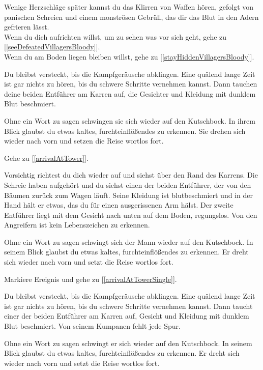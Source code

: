 Wenige Herzschläge später kannst du das Klirren von Waffen hören, gefolgt von panischen Schreien und einem monströsen Gebrüll, das dir das Blut in den Adern gefrieren lässt.
\\Wenn du dich aufrichten willst, um zu sehen was vor sich geht, gehe zu [\ref{seeDefeatedVillagersBloody}].
\\Wenn du am Boden liegen bleiben willst, gehe zu [\ref{stayHiddenVillagersBloody}].


Du bleibst versteckt, bis die Kampfgeräusche abklingen. Eine quälend lange Zeit ist gar nichts zu hören, bis du schwere Schritte vernehmen kannst. Dann tauchen deine beiden Entführer am Karren auf, die Gesichter und Kleidung mit dunklem Blut beschmiert.

Ohne ein Wort zu sagen schwingen sie sich wieder auf den Kutschbock. In ihrem Blick glaubst du etwas kaltes, furchteinflößendes zu erkennen. Sie drehen sich wieder nach vorn und setzen die Reise wortlos fort.

Gehe zu [\ref{arrivalAtTower}].


Vorsichtig richtest du dich wieder auf und siehst über den Rand des Karrens. Die Schreie haben aufgehört und du siehst einen der beiden Entführer, der von den Bäumen zurück zum Wagen läuft. Seine Kleidung ist blutbeschmiert und in der Hand hält er etwas, das du für einen ausgerissenen Arm hälst. Der zweite Entführer liegt mit dem Gesicht nach unten auf dem Boden, regungslos. Von den Angreifern ist kein Lebenszeichen zu erkennen.

Ohne ein Wort zu sagen schwingt sich der Mann wieder auf den Kutschbock. In seinem Blick glaubst du etwas kaltes, furchteinflößendes zu erkennen. Er dreht sich wieder nach vorn und setzt die Reise wortlos fort.

Markiere Ereignis  und gehe zu [\ref{arrivalAtTowerSingle}].


Du bleibst versteckt, bis die Kampfgeräusche abklingen. Eine quälend lange Zeit ist gar nichts zu hören, bis du schwere Schritte vernehmen kannst. Dann taucht einer der beiden Entführer am Karren auf, Gesicht und Kleidung mit dunklem Blut beschmiert. Von seinem Kumpanen fehlt jede Spur.

Ohne ein Wort zu sagen schwingt er sich wieder auf den Kutschbock. In seinem Blick glaubst du etwas kaltes, furchteinflößendes zu erkennen. Er dreht sich wieder nach vorn und setzt die Reise wortlos fort.

